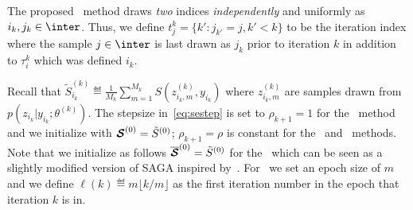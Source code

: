 \documentclass[conference,letterpaper]{IEEEtran}
\begin{document}
The proposed \FISAEM\ method draws \emph{two} indices \emph{independently} and uniformly as $i_k, j_k \in \inter$. 
Thus, we define $t_j^k = \{ k' : j_{k'} = j , k' < k \}$ to be the iteration index where the sample $j \in \inter$ is last drawn as $j_k$ prior to iteration $k$ in addition to $\tau_i^k$ which was defined \wrt $i_k$.


Recall that $\tilde{S}_{i_k}^{(k)} \eqdef  \frac{1}{M_k} \sum_{m=1}^{M_k} S(z_{i_k,m}^{(k)}, y_{i_k})$ where $z_{i_k,m}^{(k)}$ are samples drawn from $ p(z_{i_k}|y_{i_k};\theta^{(k)})$.
The stepsize in~\eqref{eq:sestep} is set to $\rho_{k+1} = 1$ for the \ISAEM\ method and we initialize with ${\bm{\mathcal{S}}}^{(0)} = \tilde{S}^{(0)}$; $\rho_{k+1} = \rho$ is  constant for the \SAEMVR\ and \FISAEM\ methods. Note that we initialize as follows $\overline{{\bm{\mathcal{S}}}}^{(0)} = \tilde{S}^{(0)}$ for the \FISAEM\ which can be seen as a slightly modified version of SAGA inspired by~\cite{reddi2016fast}.
For \SAEMVR\, we set an epoch size of $m$ and we define $\ell(k) \eqdef m \lfloor k/m \rfloor$ as the first iteration number in the epoch that iteration $k$ is in.
\end{document}

